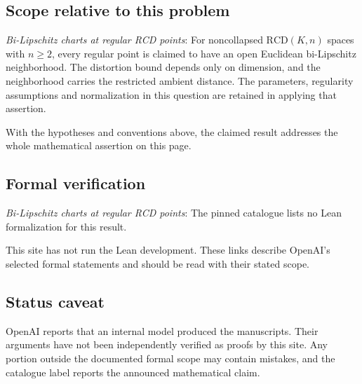 \documentclass[11pt]{article}
\begin{document}
\subsection{Scope relative to this problem}
\textit{Bi-Lipschitz charts at regular RCD points}: For noncollapsed $\mathrm{RCD}(K,n)$ spaces with $n\ge2$, every regular point is claimed to have an open Euclidean bi-Lipschitz neighborhood. The distortion bound depends only on dimension, and the neighborhood carries the restricted ambient distance. The parameters, regularity assumptions and normalization in this question are retained in applying that assertion.

With the hypotheses and conventions above, the claimed result addresses the whole mathematical assertion on this page.

\subsection{Formal verification}
\textit{Bi-Lipschitz charts at regular RCD points}: The pinned catalogue lists no Lean formalization for this result.

This site has not run the Lean development. These links describe OpenAI’s selected formal statements and should be read with their stated scope.

\subsection{Status caveat}
OpenAI reports that an internal model produced the manuscripts. Their arguments have not been independently verified as proofs by this site. Any portion outside the documented formal scope may contain mistakes, and the catalogue label reports the announced mathematical claim.
\end{document}
